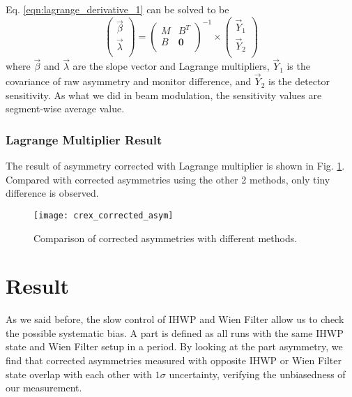 Eq. \ref{eqn:lagrange_derivative_1} can be solved to be
\begin{equation}
    \begin{pmatrix}
	\vec{\beta} \\
	\vec{\lambda}	\\
    \end{pmatrix}
    =
    \begin{pmatrix}
	M   & B^T   \\
	B   & \bm{0}	\\
    \end{pmatrix}^{-1}
    \times
    \begin{pmatrix}
	\vec{Y}_1   \\
	\vec{Y}_2   \\
    \end{pmatrix}
\end{equation}
where $\vec{\beta}$ and $\vec{\lambda}$ are the slope vector and Lagrange multipliers,
$\vec{Y}_1$ is the covariance of raw asymmetry and monitor difference, and $\vec{Y}_2$
is the detector sensitivity. As what we did in beam modulation, the sensitivity
values are segment-wise average value.

\subsubsection{Lagrange Multiplier Result}
The result of asymmetry corrected with Lagrange multiplier is shown in 
Fig. \ref{fig:crex_corrected_asym}. Compared with corrected asymmetries using
the other 2 methods, only tiny difference is observed.
\begin{figure}[H]
    \centering
    \texttt{[image: crex\_corrected\_asym]}
    \caption{Comparison of corrected asymmetries with different methods.}
    \label{fig:crex_corrected_asym}
\end{figure}

\section{Result}
As we said before, the slow control of IHWP and Wien Filter allow us to check
the possible systematic bias. A part is defined as all runs with the same IHWP state
and Wien Filter setup in a period. By looking at the part asymmetry, we find that 
corrected asymmetries measured with opposite IHWP or Wien Filter state overlap
with each other with $1\sigma$ uncertainty, verifying the unbiasedness of our
measurement.


